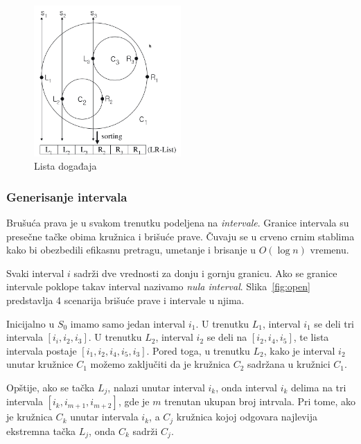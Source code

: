 \documentclass[a4paper,12pt]{article}
\begin{document}
\begin{figure}
\begin{center}
    \includegraphics[width=0.5\textwidth]{imgs/event.png}
\end{center}
    \caption{Lista događaja}
\label{fig:event}
\end{figure}

\subsubsection{Generisanje intervala}
\label{subsub:intgen}

Brušuća prava je u svakom trenutku podeljena na \emph{intervale}. Granice intervala su presečne tačke obima kružnica i brišuće prave. Čuvaju se u crveno crnim stablima kako bi obezbedili efikasnu pretragu, umetanje i brisanje u $O(\log n)$ vremenu.

Svaki interval $i$ sadrži dve vrednosti za donju i gornju granicu. Ako se granice intervale poklope takav interval nazivamo \emph{nula interval}. Slika~\ref{fig:open} predstavlja 4 scenarija brišuće prave i intervale u njima.

Inicijalno u $S_0$ imamo samo jedan interval $i_1$. U trenutku $L_1$, interval $i_1$ se deli tri intervala $[i_i, i_2, i_3]$. U trenutku $L_2$, interval $i_2$ se deli na $[i_2, i_4, i_5]$, te lista intervala postaje $[i_1, i_2, i_4, i_5, i_3]$. Pored toga, u trenutku $L_2$, kako je interval $i_2$ unutar kružnice $C_1$ možemo zaključiti da je kružnica $C_2$ sadržana u kružnici $C_1$. 

Opštije, ako se tačka $L_j$, nalazi unutar interval $i_k$, onda interval $i_k$ delima na tri intervala $[i_k, i_{m+1}, i_{m+2}]$, gde je $m$ trenutan ukupan broj intrvala. Pri tome, ako je kružnica $C_k$ unutar intervala $i_k$, a $C_j$ kružnica kojoj odgovara najlevija ekstremna tačka $L_j$, onda $C_k$ sadrži $C_j$.
\end{document}
